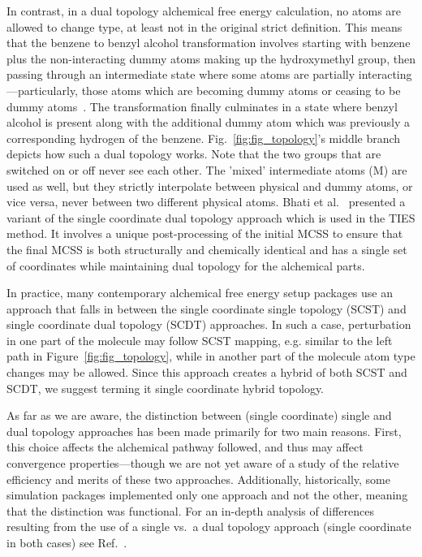 \documentclass[9pt,bestpractices]{livecoms}
\newcommand{\sbnote}[1]{%
  {\bfseries{}[SB: }%
  {\textcolor{blue}{#1}}{\bfseries{}]}
}
\begin{document}
In contrast, in a dual topology alchemical free energy calculation, no atoms are allowed to change type\cite{boresch1999role, shirts2012best}, at least not in the original strict definition. This means that the benzene to benzyl alcohol transformation involves starting with benzene plus the non-interacting dummy atoms making up the hydroxymethyl group, then passing through an intermediate state where some atoms are partially interacting---particularly, those atoms which are becoming dummy atoms or ceasing to be dummy atoms~\cite{mobley2014blind}. The transformation finally culminates in a state where benzyl alcohol is present along with the additional dummy atom which was previously a corresponding hydrogen of the benzene. Fig.~\ref{fig:fig_topology}'s middle branch depicts how such a dual topology works. Note that the two groups that are switched on or off never see each other. The 'mixed' intermediate atoms (M) are used as well, but they strictly interpolate between physical and dummy atoms, or vice versa, never between two different physical atoms.
Bhati et al.~\cite{bhati2017, bieniek2021} presented a variant of the single coordinate dual topology approach which is used in the TIES method. It involves a unique post-processing of the initial MCSS to ensure that the final MCSS is both structurally and chemically identical and has a single set of coordinates while maintaining dual topology for the alchemical parts.

In practice, many contemporary alchemical free energy setup packages use an approach that falls in between the single coordinate single topology (SCST) and single coordinate dual topology (SCDT) approaches. In such a case, perturbation in one part of the molecule may follow SCST mapping, e.g. similar to the left path in Figure~\ref{fig:fig_topology}, while in another part of the molecule atom type changes may be allowed. Since this approach creates a hybrid of both SCST and SCDT, we suggest terming it single coordinate hybrid topology.

As far as we are aware, the distinction between (single coordinate) single and dual topology approaches has been made primarily for two main reasons. First, this choice affects the alchemical pathway followed, and thus may affect convergence properties---though we are not yet aware of a study of the relative efficiency and merits of these two approaches. Additionally, historically, some simulation packages implemented only one approach and not the other, meaning that the distinction was functional. For an in-depth analysis of differences resulting from the use of a  single vs.\ a dual topology approach (single coordinate in both cases) see Ref.~\cite{Boresch_2002}.
\end{document}
